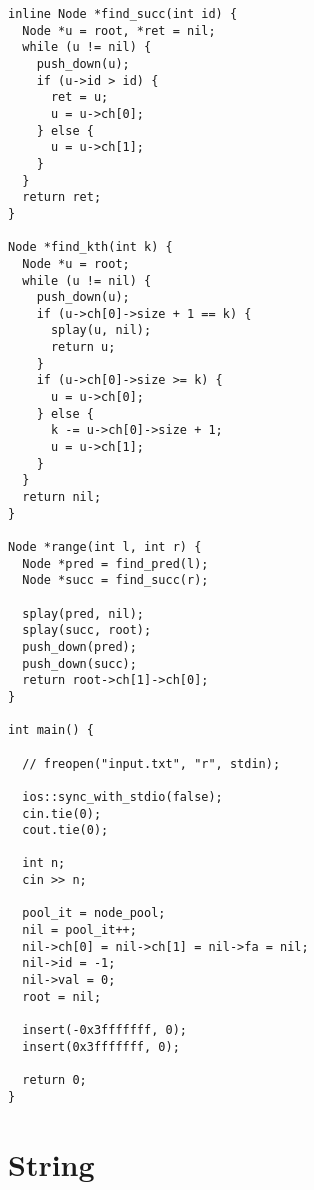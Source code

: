 \documentclass[twoside]{article}
\begin{document}
\begin{lstlisting}
inline Node *find_succ(int id) {
  Node *u = root, *ret = nil;
  while (u != nil) {
    push_down(u);
    if (u->id > id) {
      ret = u;
      u = u->ch[0];
    } else {
      u = u->ch[1];
    }
  }
  return ret;
}

Node *find_kth(int k) {
  Node *u = root;
  while (u != nil) {
    push_down(u);
    if (u->ch[0]->size + 1 == k) {
      splay(u, nil);
      return u;
    }
    if (u->ch[0]->size >= k) {
      u = u->ch[0];
    } else {
      k -= u->ch[0]->size + 1;
      u = u->ch[1];
    }
  }
  return nil;
}

Node *range(int l, int r) {
  Node *pred = find_pred(l);
  Node *succ = find_succ(r);

  splay(pred, nil);
  splay(succ, root);
  push_down(pred);
  push_down(succ);
  return root->ch[1]->ch[0];
}

int main() {

  // freopen("input.txt", "r", stdin);

  ios::sync_with_stdio(false);
  cin.tie(0);
  cout.tie(0);

  int n;
  cin >> n;

  pool_it = node_pool;
  nil = pool_it++;
  nil->ch[0] = nil->ch[1] = nil->fa = nil;
  nil->id = -1;
  nil->val = 0;
  root = nil;

  insert(-0x3fffffff, 0);
  insert(0x3fffffff, 0);

  return 0;
}

\end{lstlisting}

\section{String}
\end{document}
